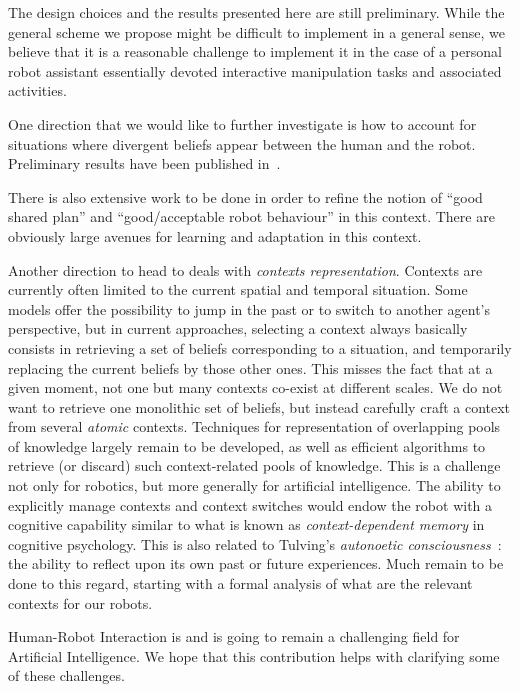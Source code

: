 \documentclass[preprint,3p,times]{elsarticle}
\begin{document}
The design choices and the results presented here are still preliminary.
While the general scheme we propose might be difficult to implement in
a general sense, we believe that it is a reasonable challenge to
implement it in the case of a personal robot assistant essentially
devoted interactive manipulation
tasks and associated activities.

One direction that we would like to further investigate is how to account for
situations where divergent beliefs appear between the human and the robot.
Preliminary results have been published in~\cite{warnier2012when}.

There is also extensive work to be done in order to refine the notion of ``good
shared plan'' and ``good/acceptable robot behaviour'' in this context. There are
obviously large avenues for learning and adaptation in this context.

Another direction to head to deals with \emph{contexts representation}.
Contexts are currently often limited to the current spatial and temporal
situation. Some models offer the possibility to jump in the past or to switch to
another agent's perspective, but in current approaches, selecting a context
always basically consists in retrieving a set of beliefs corresponding to a
situation, and temporarily replacing the current beliefs by those other ones.
This misses the fact that at a given moment, not one but many contexts co-exist
at different scales. We do not want to retrieve one monolithic set of beliefs,
but instead carefully craft a context from several \emph{atomic} contexts.
Techniques for representation of overlapping pools of knowledge largely remain
to be developed, as well as efficient algorithms to retrieve (or discard) such
context-related pools of knowledge. This is a challenge not only for robotics,
but more generally for artificial intelligence.  The ability to explicitly
manage contexts and context switches would endow the robot with a cognitive
capability similar to what is known as \emph{context-dependent memory} in
cognitive psychology. This is also related to Tulving's \emph{autonoetic
consciousness}~\cite{Tulving1985a}: the ability to reflect upon its own past or
future experiences.  Much remain to be done to this regard, starting with a
formal analysis of what are the relevant contexts for our robots.

Human-Robot Interaction is and is going to remain a challenging field for
Artificial Intelligence. We hope that this contribution helps with clarifying
some of these challenges.
\end{document}
